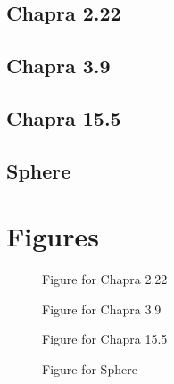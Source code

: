 \documentclass{article}
\begin{document}


\lstset{style=python103, language=python} 

\subsection{Chapra 2.22}
\pagebreak

\subsection{Chapra 3.9}
\pagebreak

\subsection{Chapra 15.5}
\pagebreak

\subsection{Sphere}

\clearpage %

\section{Figures}

\begin{figure}[ht!]
\begin{center}
\caption{Figure for Chapra 2.22}
\end{center}
\end{figure}

\begin{figure}[ht!]
\begin{center}
\caption{Figure for Chapra 3.9}
\end{center}
\end{figure}

\begin{figure}[ht!]
\begin{center}
\caption{Figure for Chapra 15.5}
\end{center}
\end{figure}

\begin{figure}[ht!]
\begin{center}
\caption{Figure for Sphere}
\end{center}
\end{figure}
\end{document}
